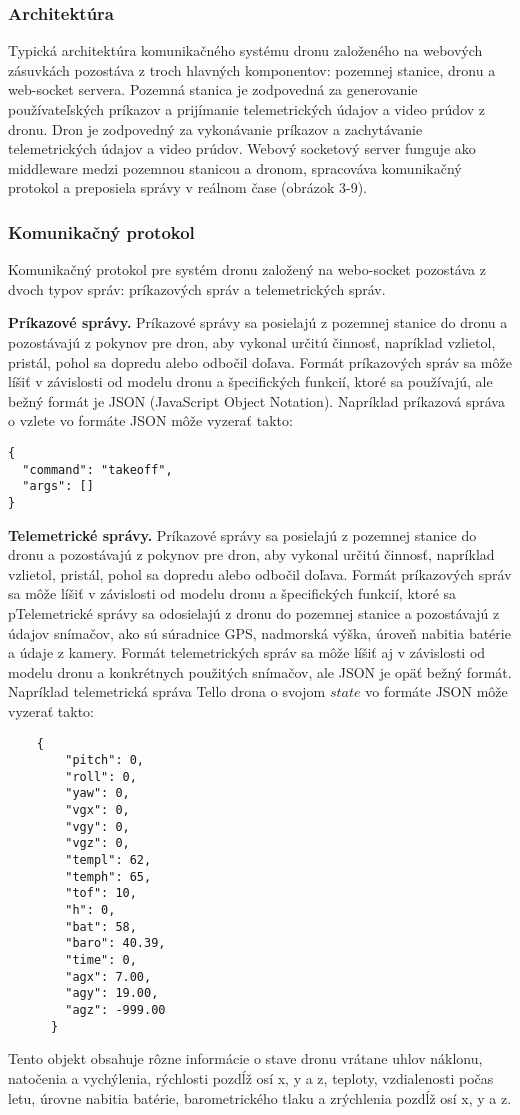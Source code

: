 {\subsubsection{Architektúra}
Typická architektúra komunikačného systému dronu založeného na webových zásuvkách pozostáva z troch hlavných komponentov: pozemnej stanice, dronu a web-socket servera. Pozemná stanica je zodpovedná za generovanie používateľských príkazov a prijímanie telemetrických údajov a video prúdov z dronu. Dron je zodpovedný za vykonávanie príkazov a zachytávanie telemetrických údajov a video prúdov. Webový socketový server funguje ako middleware medzi pozemnou stanicou a dronom, spracováva komunikačný protokol a preposiela správy v reálnom čase (obrázok 3-9).



\subsubsection{Komunikačný protokol}
Komunikačný protokol pre systém dronu založený na webo-socket pozostáva z dvoch typov správ: príkazových správ a telemetrických správ.

\textbf{Príkazové správy.} Príkazové správy sa posielajú z pozemnej stanice do dronu a pozostávajú z pokynov pre dron, aby vykonal určitú činnosť, napríklad vzlietol, pristál, pohol sa dopredu alebo odbočil doľava. Formát príkazových správ sa môže líšiť v závislosti od modelu dronu a špecifických funkcií, ktoré sa používajú, ale bežný formát je JSON (JavaScript Object Notation). Napríklad príkazová správa o vzlete vo formáte JSON môže vyzerať takto:
\begin{verbatim}
{
  "command": "takeoff",
  "args": []
}
\end{verbatim}

\textbf{Telemetrické správy.} Príkazové správy sa posielajú z pozemnej stanice do dronu a pozostávajú z pokynov pre dron, aby vykonal určitú činnosť, napríklad vzlietol, pristál, pohol sa dopredu alebo odbočil doľava. Formát príkazových správ sa môže líšiť v závislosti od modelu dronu a špecifických funkcií, ktoré sa pTelemetrické správy sa odosielajú z dronu do pozemnej stanice a pozostávajú z údajov snímačov, ako sú súradnice GPS, nadmorská výška, úroveň nabitia batérie a údaje z kamery. Formát telemetrických správ sa môže líšiť aj v závislosti od modelu dronu a konkrétnych použitých snímačov, ale JSON je opäť bežný formát. Napríklad telemetrická správa Tello drona o svojom $state$ vo formáte JSON môže vyzerať takto:
\begin{verbatim}
    {
        "pitch": 0,
        "roll": 0,
        "yaw": 0,
        "vgx": 0,
        "vgy": 0,
        "vgz": 0,
        "templ": 62,
        "temph": 65,
        "tof": 10,
        "h": 0,
        "bat": 58,
        "baro": 40.39,
        "time": 0,
        "agx": 7.00,
        "agy": 19.00,
        "agz": -999.00
      }
\end{verbatim}
Tento objekt obsahuje rôzne informácie o stave dronu vrátane uhlov náklonu, natočenia a vychýlenia, rýchlosti pozdĺž osí x, y a z, teploty, vzdialenosti počas letu, úrovne nabitia batérie, barometrického tlaku a zrýchlenia pozdĺž osí x, y a z.

}
